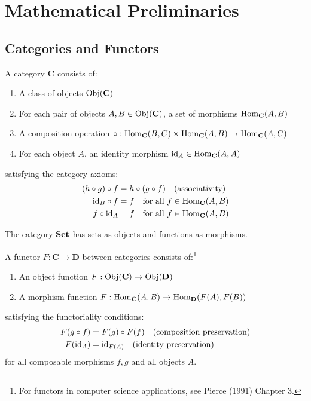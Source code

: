 \newpage

\section{Mathematical Preliminaries}

\subsection{Categories and Functors}

\begin{definition}[Category]
A category $\mathbf{C}$ consists of:
\begin{enumerate}
\item A class of objects $\mathrm{Obj}(\mathbf{C})$
\item For each pair of objects $A, B \in \mathrm{Obj}(\mathbf{C})$, a set of morphisms $\mathrm{Hom}_{\mathbf{C}}(A,B)$
\item A composition operation $\circ: \mathrm{Hom}_{\mathbf{C}}(B,C) \times \mathrm{Hom}_{\mathbf{C}}(A,B) \to \mathrm{Hom}_{\mathbf{C}}(A,C)$
\item For each object $A$, an identity morphism $\mathrm{id}_A \in \mathrm{Hom}_{\mathbf{C}}(A,A)$
\end{enumerate}
satisfying the category axioms:
\begin{align}
(h \circ g) \circ f &= h \circ (g \circ f) \quad \text{(associativity)} \\
\mathrm{id}_B \circ f &= f \quad \text{for all } f \in \mathrm{Hom}_{\mathbf{C}}(A,B) \\
f \circ \mathrm{id}_A &= f \quad \text{for all } f \in \mathrm{Hom}_{\mathbf{C}}(A,B)
\end{align}
\end{definition}

\begin{example}
The category $\mathbf{Set}$ has sets as objects and functions as morphisms.
\end{example}

\begin{definition}[Functor]
A functor $F: \mathbf{C} \to \mathbf{D}$ between categories consists of:\footnote{For functors in computer science applications, see Pierce (1991) Chapter 3.}
\begin{enumerate}
\item An object function $F: \mathrm{Obj}(\mathbf{C}) \to \mathrm{Obj}(\mathbf{D})$
\item A morphism function $F: \mathrm{Hom}_{\mathbf{C}}(A,B) \to \mathrm{Hom}_{\mathbf{D}}(F(A),F(B))$
\end{enumerate}
satisfying the functoriality conditions:
\begin{align}
F(g \circ f) &= F(g) \circ F(f) \quad \text{(composition preservation)} \\
F(\mathrm{id}_A) &= \mathrm{id}_{F(A)} \quad \text{(identity preservation)}
\end{align}
for all composable morphisms $f, g$ and all objects $A$.
\end{definition}

